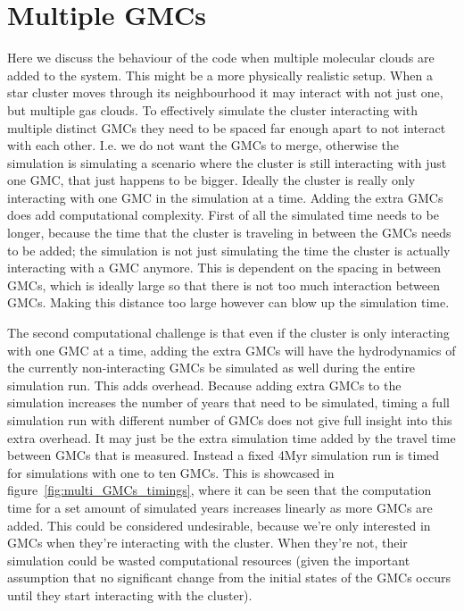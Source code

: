 \documentclass{aa}
\begin{document}
\section{Multiple GMCs} \label{sec:multiplegmc}
Here we discuss the behaviour of the code when multiple molecular clouds are added to the system. This might be a more physically realistic setup. When a star cluster moves through its neighbourhood it may interact with not just one, but multiple gas clouds. To effectively simulate the cluster interacting with multiple distinct GMCs they need to be spaced far enough apart to not interact with each other. I.e. we do not want the GMCs to merge, otherwise the simulation is simulating a scenario where the cluster is still interacting with just one GMC, that just happens to be bigger. Ideally the cluster is really only interacting with one GMC in the simulation at a time. Adding the extra GMCs does add computational complexity. First of all the simulated time needs to be longer, because the time that the cluster is traveling in between the GMCs needs to be added; the simulation is not just simulating the time the cluster is actually interacting with a GMC anymore. This is dependent on the spacing in between GMCs, which is ideally large so that there is not too much interaction between GMCs. Making this distance too large however can blow up the simulation time.

The second computational challenge is that even if the cluster is only interacting with one GMC at a time, adding the extra GMCs will have the hydrodynamics of the currently non-interacting GMCs be simulated as well during the entire simulation run. This adds overhead. Because adding extra GMCs to the simulation increases the number of years that need to be simulated, timing a full simulation run with different number of GMCs does not give full insight into this extra overhead. It may just be the extra simulation time added by the travel time between GMCs that is measured. Instead a fixed 4Myr simulation run is timed for simulations with one to ten GMCs. This is showcased in figure~\ref{fig:multi_GMCs_timings}, where it can be seen that the computation time for a set amount of simulated years increases linearly as more GMCs are added. This could be considered undesirable, because we're only interested in GMCs when they're interacting with the cluster. When they're not, their simulation could be wasted computational resources (given the important assumption that no significant change from the initial states of the GMCs occurs until they start interacting with the cluster).
\end{document}
